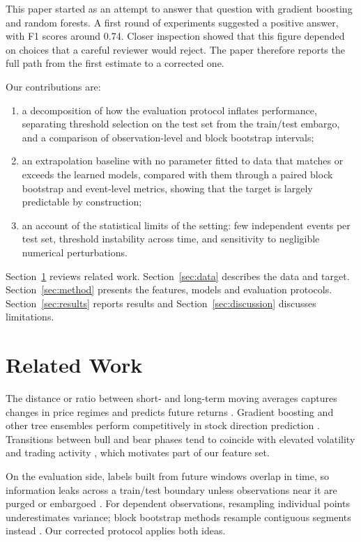 \documentclass[11pt,a4paper]{article}
\begin{document}
This paper started as an attempt to answer that question with gradient boosting and random
forests. A first round of experiments suggested a positive answer, with F1 scores around 0.74.
Closer inspection showed that this figure depended on choices that a careful reviewer would
reject. The paper therefore reports the full path from the first estimate to a corrected one.

Our contributions are:
\begin{enumerate}
  \item a decomposition of how the evaluation protocol inflates performance, separating threshold
        selection on the test set from the train/test embargo, and a comparison of
        observation-level and block bootstrap intervals;
  \item an extrapolation baseline with no parameter fitted to data that matches or exceeds the
        learned models, compared with them through a paired block bootstrap and event-level
        metrics, showing that the target is largely predictable by construction;
  \item an account of the statistical limits of the setting: few independent events per test set,
        threshold instability across time, and sensitivity to negligible numerical perturbations.
\end{enumerate}

Section~\ref{sec:related} reviews related work. Section~\ref{sec:data} describes the data and
target. Section~\ref{sec:method} presents the features, models and evaluation protocols.
Section~\ref{sec:results} reports results and Section~\ref{sec:discussion} discusses limitations.

\section{Related Work}\label{sec:related}

The distance or ratio between short- and long-term moving averages captures changes in price
regimes and predicts future returns \citep{avramov2018,bhootra2024}. Gradient boosting
\citep{chen2016} and other tree ensembles perform competitively in stock direction prediction
\citep{ampomah2020}. Transitions between bull and bear phases tend to coincide with elevated
volatility and trading activity \citep{catao2010}, which motivates part of our feature set.

On the evaluation side, labels built from future windows overlap in time, so information leaks
across a train/test boundary unless observations near it are purged or embargoed
\citep{lopezdeprado2018}. For dependent observations, resampling individual points underestimates
variance; block bootstrap methods resample contiguous segments instead \citep{kunsch1989}. Our
corrected protocol applies both ideas.
\end{document}
